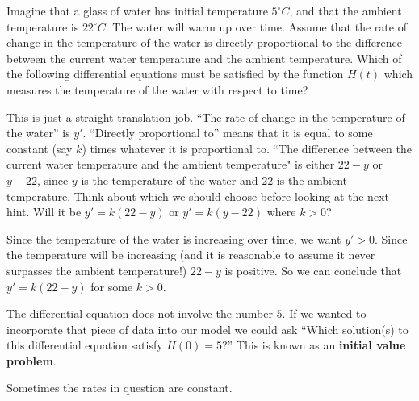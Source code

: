 \documentclass{ximera}
\begin{document}
\begin{question}
  Imagine that a glass of water has initial temperature $5^\circ
  \unit{C}$, and that the ambient temperature is $22^\circ \unit{C}$.
  The water will warm up over time.  Assume that the rate of change in
  the temperature of the water is directly proportional to the
  difference between the current water temperature and the ambient
  temperature.  Which of the following differential equations must be
  satisfied by the function $H(t)$ which measures the temperature of
  the water with respect to time?
  \begin{multipleChoice}
  \end{multipleChoice}
  \begin{hint}
    This is just a straight translation job.  ``The rate of change in
    the temperature of the water'' is $y'$.  ``Directly proportional
    to'' means that it is equal to some constant (say $k$) times
    whatever it is proportional to.  ``The difference between the
    current water temperature and the ambient temperature" is either
    $22-y$ or $y-22$, since $y$ is the temperature of the water and
    $22$ is the ambient temperature.  Think about which we should
    choose before looking at the next hint.  Will it be $y'=k(22-y)$
    or $y'=k(y-22)$ where $k>0$?
  \end{hint}
  \begin{hint}
    Since the temperature of the water is increasing over time, we
    want $y'>0$.  Since the temperature will be increasing (and it is
    reasonable to assume it never surpasses the ambient temperature!)
    $22-y$ is positive.  So we can conclude that $y' = k(22-y)$ for
    some $k>0$.
  \end{hint}
  
  \begin{feedback}
    The differential equation does not involve the number $5$.  If we
    wanted to incorporate that piece of data into our model we could
    ask ``Which solution(s) to this differential equation satisfy
    $H(0) = 5$?''  This is known as an \textbf{initial value problem}.  %
  \end{feedback}
\end{question}


Sometimes the rates in question are constant.
\end{document}
